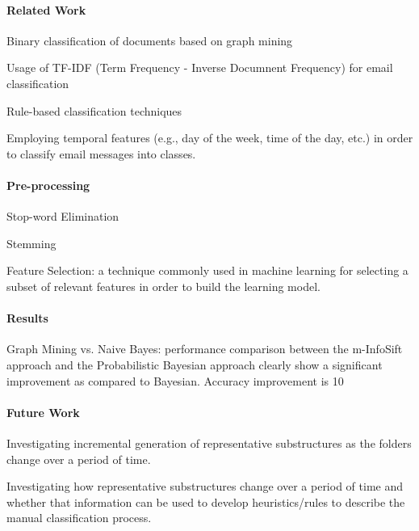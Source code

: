\documentclass[12pt]{article}
\newenvironment{my_itemize}
{\begin{itemize}
  \setlength{\itemsep}{0cm}
  \setlength{\parskip}{0cm}}
{\end{itemize}}
\begin{document}
\paragraph{Related Work}
\begin{my_itemize}
 \item Binary classification of documents based on graph mining
 \item Usage of TF-IDF (Term Frequency - Inverse Documnent Frequency) for email classification
 \item Rule-based classification techniques
 \item Employing temporal features (e.g., day of the week, time of the day, etc.) in order to classify email messages into classes.
\end{my_itemize}
	 	
\paragraph{Pre-processing}
\begin{my_itemize}
 \item Stop-word Elimination
 \item Stemming
 \item Feature Selection: a technique commonly used in machine learning for selecting a subset of relevant features in order to build the learning model.
\end{my_itemize}
	 	
\paragraph{Results}
\begin{my_itemize}
 \item Graph Mining vs. Naive Bayes: performance comparison between the m-InfoSift approach and the Probabilistic Bayesian approach clearly show a significant improvement as compared to Bayesian. Accuracy improvement is 10%
\end{my_itemize}

\paragraph{Future Work}
\begin{my_itemize}
 \item Investigating incremental generation of representative substructures as the folders change over a period of time. 
 \item Investigating how representative substructures change over a period of time and whether that information can be used to develop heuristics/rules to describe the manual classification process.
\end{my_itemize}
\end{document}
